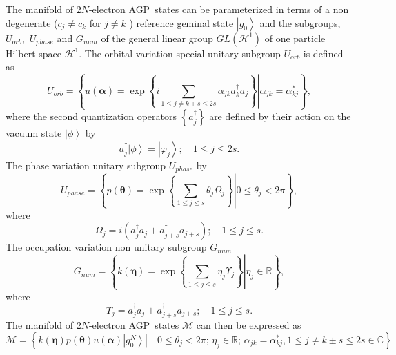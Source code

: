 \documentclass[aps,preprint]{revtex4}%
\begin{document}
The manifold of $2N$-electron AGP\ states can be parameterized in terms of a
non degenerate ($c_{j}\neq c_{k}$ for $j\neq k$ ) reference geminal state
$\left\vert g_{0}\right\rangle $ and the subgroups, $U_{orb},$ $U_{phase}$ and
$G_{num}$ of the general linear group $GL\left(  \mathcal{H}^{1}\right)  $ of
one particle Hilbert space $\mathcal{H}^{1}$. The orbital variation special
unitary subgroup $U_{orb}$ is defined as
\begin{equation}
U_{orb}=\left\{  \left.  u\left(  \mathbf{\alpha}\right)  =\exp\left\{
i\sum_{1\leq j\neq k\pm s\leq2s}\alpha_{jk}a_{k}^{\dagger}a_{j}\right\}
\right\vert \alpha_{jk}=\alpha_{kj}^{\ast}\right\}  , \label{orb}%
\end{equation}
where the second quantization operators $\left\{  a_{j}^{\dagger}\right\}  $
are defined by their action on the vacuum state $\left\vert \phi\right\rangle
$ by
\begin{equation}
a_{j}^{\dagger}\left\vert \phi\right\rangle =\left\vert \varphi_{j}%
\right\rangle ;\quad1\leq j\leq2s.
\end{equation}
The phase variation unitary subgroup $U_{phase}$ by%
\begin{equation}
U_{phase}=\left\{  \left.  p\left(  \mathbf{\theta}\right)  =\exp\left\{
\sum_{1\leq j\leq s}\theta_{j}\Omega_{j}\right\}  \right\vert 0\leq\theta
_{j}<2\pi\right\}  , \label{phase}%
\end{equation}
where
\begin{equation}
\Omega_{j}=i\left(  a_{j}^{\dagger}a_{j}+a_{j+s}^{\dagger}a_{j+s}\right)
;\quad1\leq j\leq s.
\end{equation}
The occupation variation non unitary subgroup $G_{num}$
\begin{equation}
G_{num}=\left\{  \left.  k\left(  \mathbf{\eta}\right)  =\exp\left\{
\sum_{1\leq j\leq s}\eta_{j}\Upsilon_{j}\right\}  \right\vert \eta_{j}%
\in\mathbb{R}\right\}  , \label{occup}%
\end{equation}
where
\begin{equation}
\Upsilon_{j}=a_{j}^{\dagger}a_{j}+a_{j+s}^{\dagger}a_{j+s};\quad1\leq j\leq s.
\end{equation}
The manifold of $2N$-electron AGP\ states $\mathcal{M}$ can then be expressed
as
\begin{equation}
\mathcal{M=}\left\{  \left.  k\left(  \mathbf{\eta}\right)  p\left(
\mathbf{\theta}\right)  u\left(  \mathbf{\alpha}\right)  \left\vert g_{0}%
^{N}\right\rangle \right\vert \quad0\leq\theta_{j}<2\pi;\,\eta_{j}%
\in\mathbb{R};\,\alpha_{jk}=\alpha_{kj}^{\ast},1\leq j\neq k\pm s\leq
2s\in\mathbb{C}\right\}
\end{equation}
\end{document}

